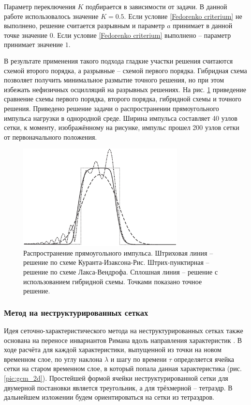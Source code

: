 Параметр переключения $K$ подбирается в зависимости от задачи. В данной работе использовалось значение $K = 0.5$. Если условие \eqref{Fedorenko criterium} не выполнено, решение считается разрывным и параметр $a$ принимает в данной точке значение $0$. Если условие \eqref{Fedorenko criterium} выполнено -- параметр принимает значение $1$.

В результате применения такого подхода гладкие участки решения считаются схемой второго порядка, а разрывные -- схемой первого порядка. Гибридная схема позволяет получить минимальное размытие точного решения, но при этом избежать нефизичных осцилляций на разрывных решениях. На рис. \ref{pic:hybrid-scheme-testing} приведение сравнение схемы первого порядка, второго порядка, гибридной схемы и точного решения. Приведено решение задачи о распространении прямоугольного импульса нагрузки в однородной среде. Ширина импульса составляет 40 узлов сетки, к моменту, изображённому на рисунке, импульс прошел 200 узлов сетки от первоначального положения.

\begin{figure}[h]
\centerline{\includegraphics[width=0.75\textwidth]{png/hybrid-scheme-testing.png}}
\caption{Распространение прямоугольного импульса. Штриховая линия -- решение по схеме Куранта-Изаксона-Рис. Штрих-пунктирная -- решение по схеме Лакса-Вендрофа. Сплошная линия -- решение с использованием гибридной схемы. Точками показано точное решение.}
\label{pic:hybrid-scheme-testing}
\end{figure}

\subsubsection{Метод на неструктурированных сетках}

Идея сеточно-характеристического метода на неструктурированных сетках также основана на переносе инвариантов Римана вдоль направления характеристик \cite{magomedov}. В ходе расчёта для каждой характеристики, выпущенной из точки на новом временном слое, по углу наклона $\lambda$ и шагу по времени $\tau$ определяется ячейка сетки на старом временном слое, в который попала данная характеристика (рис. \ref{pic:gcm_2d}). Простейшей формой ячейки неструктурированной сетки для двумерной постановки является треугольник, а для трёхмерной -- тетраэдр. В дальнейшем изложении будем ориентироваться на сетки из тетраэдров.

